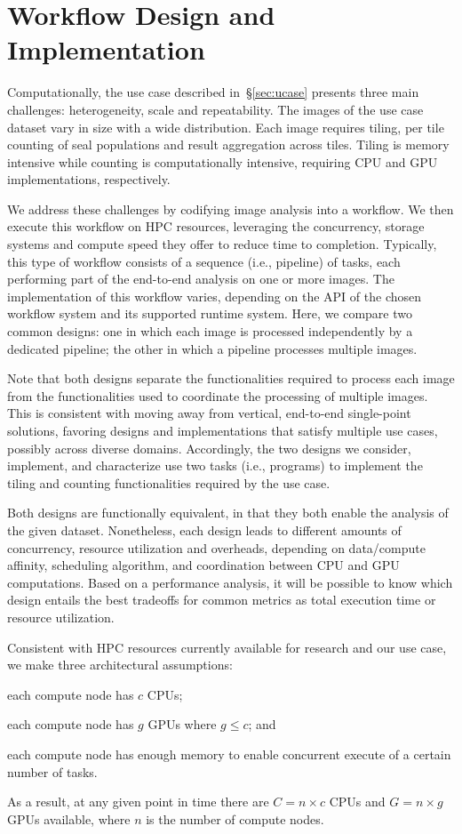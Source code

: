 \section{Workflow Design and Implementation}\label{sec:design}
Computationally, the use case described in~\S\ref{sec:ucase} presents three main challenges: heterogeneity, scale and repeatability.
The images of the use case dataset vary in size with a wide distribution.
Each image requires tiling, per tile counting of seal populations and result aggregation across tiles.
Tiling is memory intensive while counting is computationally intensive, requiring CPU and GPU implementations, respectively.

We address these challenges by codifying image analysis into a workflow.
We then execute this workflow on HPC resources, leveraging the concurrency, storage systems and compute speed they offer to reduce time to completion.
Typically, this type of workflow consists of a sequence (i.e., pipeline) of tasks, each performing part of the end-to-end analysis on one or more images.
The implementation of this workflow varies, depending on the API of the chosen workflow system and its supported runtime system.
Here, we compare two common designs: one in which each image is processed independently by a dedicated pipeline; the other in which a pipeline processes multiple images.

Note that both designs separate the functionalities required to process each image from the functionalities used to coordinate the processing of multiple images.
This is consistent with moving away from vertical, end-to-end single-point solutions, favoring designs and implementations that satisfy multiple use cases, possibly across diverse domains.
Accordingly, the two designs we consider, implement, and characterize use two tasks (i.e., programs) to implement the tiling and counting functionalities required by the use case.

Both designs are functionally equivalent, in that they both enable the analysis of the given dataset.
Nonetheless, each design leads to different amounts of concurrency, resource utilization and overheads, depending on data/compute affinity, scheduling algorithm, and coordination between CPU and GPU computations.
Based on a performance analysis, it will be possible to know which design entails the best tradeoffs for common metrics as total execution time or resource utilization.

Consistent with HPC resources currently available for research and our use case, we make three architectural assumptions: 
\begin{inparaenum}[(1)]
    \item each compute node has $c$ CPUs;
    \item each compute node has $g$ GPUs where $g \le c$; and
    \item each compute node has enough memory to enable concurrent execute of a certain number of tasks.
\end{inparaenum}
As a result, at any given point in time there are $C = n\times c$ CPUs and $G = n\times g$ GPUs available, where $n$ is the number of compute nodes.

